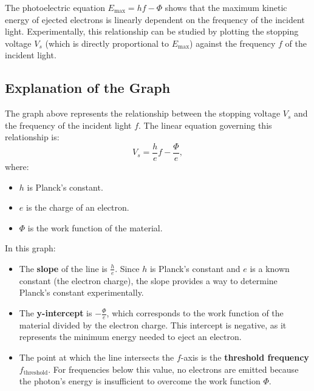 \documentclass{report}
\begin{document}
The photoelectric equation $E_{\text{max}} = h f - \Phi$ shows that the maximum kinetic energy of ejected electrons is linearly dependent on the frequency of the incident light. Experimentally, this relationship can be studied by plotting the stopping voltage $V_s$ (which is directly proportional to $E_{\text{max}}$) against the frequency $f$ of the incident light.


\begin{center}
\end{center}

\subsection{Explanation of the Graph}

The graph above represents the relationship between the stopping voltage $V_s$ and the frequency of the incident light $f$. The linear equation governing this relationship is:
\[
	V_s = \frac{h}{e} f - \frac{\Phi}{e},
\]
where:
\begin{itemize}
	\item $h$ is Planck’s constant.
	\item $e$ is the charge of an electron.
	\item $\Phi$ is the work function of the material.
\end{itemize}

In this graph:
\begin{itemize}
	\item The \textbf{slope} of the line is $\frac{h}{e}$. Since $h$ is Planck's constant and $e$ is a known constant (the electron charge), the slope provides a way to determine Planck's constant experimentally.
	\item The \textbf{y-intercept} is $-\frac{\Phi}{e}$, which corresponds to the work function of the material divided by the electron charge. This intercept is negative, as it represents the minimum energy needed to eject an electron.
	\item The point at which the line intersects the $f$-axis is the \textbf{threshold frequency} $f_{\text{threshold}}$. For frequencies below this value, no electrons are emitted because the photon's energy is insufficient to overcome the work function $\Phi$.
\end{itemize}
\end{document}
